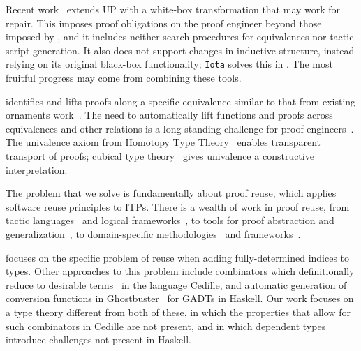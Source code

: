 Recent work~\cite{tabareau2019marriage} extends UP with 
a white-box transformation that may work for repair.
This imposes proof obligations on the proof engineer beyond those imposed by \toolname,
and it includes neither search procedures for equivalences nor tactic script generation.
It also does not support changes in inductive structure,
instead relying on its original black-box functionality;
\lstinline{Iota} solves this in \toolname. %
The most fruitful progress may come from combining these tools. %


\toolnameb identifies and lifts proofs along a specific equivalence 
similar to that from existing ornaments work~\cite{ko2016programming}.
The need to automatically lift functions and proofs
across equivalences and other relations is a long-standing challenge for proof 
engineers~\cite{magaud2000changing, barthe2001type, magaud2003changing, huffman2013lifting, zimmermann2015automatic, cohen:hal-01414881}.
The univalence axiom from Homotopy Type Theory~\cite{univalent2013homotopy} enables transparent transport of proofs;
cubical type theory~\cite{cohen2016cubical} gives univalence a constructive interpretation. 

The problem that we solve is fundamentally about proof reuse,
which applies software reuse principles to ITPs. 
There is a wealth of work in proof reuse, from tactic languages~\cite{felty1994generalization} and logical frameworks~\cite{caplan1995logical},
to tools for proof abstraction and generalization~\cite{pons2000generalization, johnsen2004theorem},
to domain-specific methodologies~\cite{Delaware:2011:PLT:2048066.2048113} and frameworks~\cite{Delaware:2013:MLC:2429069.2429094}.

\toolnameb focuses on the specific problem of reuse
when adding fully-determined indices to types.
Other approaches to this problem include combinators which definitionally reduce to desirable terms~\cite{DBLP:journals/corr/abs-1803-08150} in the language Cedille,
and automatic generation of conversion functions in Ghostbuster~\cite{McDonell:2016:GTS:2951913.2951914} for GADTs in Haskell.
Our work focuses on a type theory different from both of these, in which the properties that allow for such combinators in Cedille are not present, and in which dependent types introduce challenges not present in Haskell.

